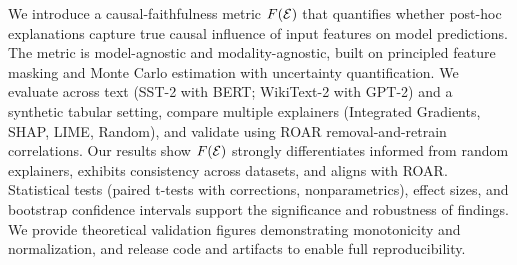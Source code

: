 We introduce a causal-faithfulness metric $F(\mathcal{E})$ that quantifies whether post-hoc explanations capture true causal influence of input features on model predictions. The metric is model-agnostic and modality-agnostic, built on principled feature masking and Monte Carlo estimation with uncertainty quantification. We evaluate across text (SST-2 with BERT; WikiText-2 with GPT-2) and a synthetic tabular setting, compare multiple explainers (Integrated Gradients, SHAP, LIME, Random), and validate using ROAR removal-and-retrain correlations. Our results show $F(\mathcal{E})$ strongly differentiates informed from random explainers, exhibits consistency across datasets, and aligns with ROAR. Statistical tests (paired t-tests with corrections, nonparametrics), effect sizes, and bootstrap confidence intervals support the significance and robustness of findings. We provide theoretical validation figures demonstrating monotonicity and normalization, and release code and artifacts to enable full reproducibility.

